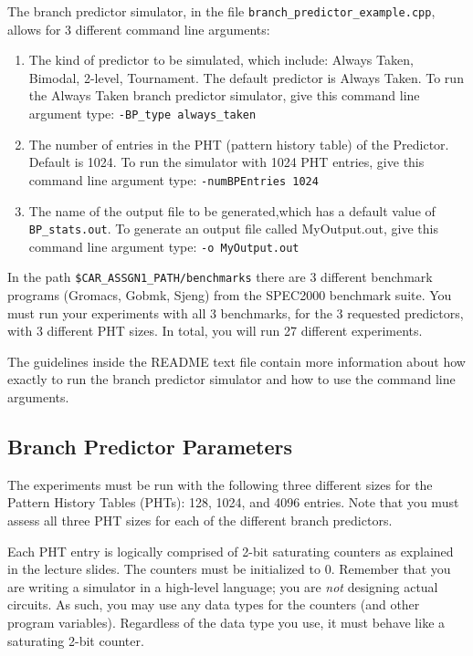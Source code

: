 \documentclass[a4paper,12pt]{article}
\theoremstyle{plain}
\begin{document}
The branch predictor simulator, in the file \texttt{branch\_predictor\_example.cpp}, allows for 3 different command line arguments: 
\begin{enumerate}
    \item The kind of predictor to be simulated, which include: Always Taken, Bimodal, 2-level, Tournament. The default predictor is Always Taken. To run the Always Taken branch predictor simulator, give this command line argument type: \texttt{-BP\_type always\_taken}
    
    \item The number of entries in the PHT (pattern history table) of the Predictor. Default is 1024. To run the simulator with 1024 PHT entries, give this command line argument type: \texttt{-numBPEntries 1024}
    
    \item The name of the output file to be generated,which has a default value of \texttt{BP\_stats.out}. To generate an output file called MyOutput.out, give this command line argument type: \texttt{-o MyOutput.out}
\end{enumerate}
 
 In the path \texttt{\$CAR\_ASSGN1\_PATH/benchmarks} there are 3 different benchmark programs (Gromacs, Gobmk, Sjeng) from the SPEC2000 benchmark suite. You must run your experiments with all 3 benchmarks, for the 3 requested predictors, with 3 different PHT sizes. In total, you will run 27 different experiments.

 The guidelines inside the README text  file contain more information about how exactly to run the branch predictor simulator and how to use the command line arguments.

\subsection{Branch Predictor Parameters}

The experiments must be run with the following three different sizes for the Pattern History Tables (PHTs): 128, 1024, and 4096 entries. Note that you must assess all three PHT sizes for each of the different branch predictors. 

Each PHT entry is logically comprised of 2-bit saturating counters as explained in the lecture slides. The counters must be initialized to 0. Remember that you are writing a simulator in a high-level language; you are {\em not} designing actual circuits. As such, you may use any data types for the counters (and other program variables). Regardless of the data type you use, it must behave like a saturating 2-bit counter. 
\end{document}
